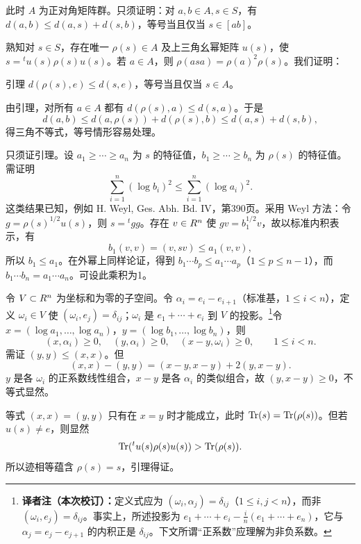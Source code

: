 此时 $A$ 为正对角矩阵群。只须证明：对 $a,b\in A,s\in S$，有 $d(a,b)\le d(a,s)+d(s,b)$，等号当且仅当 $s\in[ab]$。

熟知对 $s\in S$，存在唯一 $\rho(s)\in A$ 及上三角幺幂矩阵 $u(s)$，使 $s={}^tu(s)\rho(s)u(s)$。若 $a\in A$，则 $\rho(asa)=\rho(a)^2\rho(s)$。我们证明：
\begin{originaltheorem}{引理}
$d(\rho(s),e)\le d(s,e)$，等号当且仅当 $s\in A$。
\end{originaltheorem}
由引理，对所有 $a\in A$ 都有 $d(\rho(s),a)\le d(s,a)$。于是
\[
 d(a,b)\le d(a,\rho(s))+d(\rho(s),b)\le d(a,s)+d(s,b),
\]
得三角不等式，等号情形容易处理。

只须证引理。设 $a_1\ge\cdots\ge a_n$ 为 $s$ 的特征值，$b_1\ge\cdots\ge b_n$ 为 $\rho(s)$ 的特征值。需证明
\[
 \sum_{i=1}^n(\log b_i)^2\le\sum_{i=1}^n(\log a_i)^2.
\]
这类结果已知，例如 H. Weyl, Ges. Abh. Bd. IV，第390页。采用 Weyl 方法：令 $g=\rho(s)^{1/2}u(s)$，则 $s={}^tgg$。存在 $v\in R^n$ 使 $gv=b_1^{1/2}v$，故以标准内积表示，有
\[
 b_1(v,v)=(v,sv)\le a_1(v,v),
\]
所以 $b_1\le a_1$。在外幂上同样论证，得到
$b_1\cdots b_p\le a_1\cdots a_p$（$1\le p\le n-1$），而 $b_1\cdots b_n=a_1\cdots a_n$。可设此乘积为1。

令 $V\subset R^n$ 为坐标和为零的子空间。令 $\alpha_i=e_i-e_{i+1}$（标准基，$1\le i<n$），定义 $\omega_i\in V$ 使 $(\omega_i,e_j)=\delta_{ij}$；$\omega_i$ 是 $e_1+\cdots+e_i$ 到 $V$ 的投影。\footnote{\textbf{译者注（本次校订）：}定义式应为 $(\omega_i,\alpha_j)=\delta_{ij}$（$1\le i,j<n$），而非 $(\omega_i,e_j)=\delta_{ij}$。事实上，所述投影为 $e_1+\cdots+e_i-\frac{i}{n}(e_1+\cdots+e_n)$，它与 $\alpha_j=e_j-e_{j+1}$ 的内积正是 $\delta_{ij}$。下文所谓“正系数”应理解为非负系数。}令 $x=(\log a_1,\ldots,\log a_n)$，$y=(\log b_1,\ldots,\log b_n)$，则
\[
 (x,\alpha_i)\ge0,\quad(y,\alpha_i)\ge0,\quad(x-y,\omega_i)\ge0,
 \qquad1\le i<n.
\]
需证 $(y,y)\le(x,x)$。但
\[
 (x,x)-(y,y)=(x-y,x-y)+2(y,x-y).
\]
$y$ 是各 $\omega_i$ 的正系数线性组合，$x-y$ 是各 $\alpha_i$ 的类似组合，故 $(y,x-y)\ge0$，不等式显然。

等式 $(x,x)=(y,y)$ 只有在 $x=y$ 时才能成立，此时 $\operatorname{Tr}(s)=\operatorname{Tr}(\rho(s))$。但若 $u(s)\ne e$，则显然
\[
 \operatorname{Tr}({}^tu(s)\rho(s)u(s))>\operatorname{Tr}(\rho(s)).
\]
所以迹相等蕴含 $\rho(s)=s$，引理得证。

